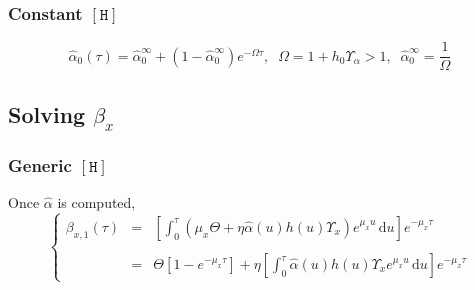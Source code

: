 \documentclass[aps,onecolumn,12pt]{revtex4}
\newcommand{\mychem}[1]{\mathtt{#1}}
\newcommand{\myconc}[1]{\left\lbrack{#1}\right\rbrack}
\newcommand{\spproton}{\mychem{H}}
\newcommand{\proton}{\myconc{\spproton}}
\begin{document}
\subsubsection{Constant $\proton$}
\begin{equation}
	\hat\alpha_0(\tau) = {\hat\alpha_0^\infty + \left(1-\hat\alpha_0^\infty\right) e^{-\Omega \tau} },
	\;\;\Omega=1+h_0\Upsilon_\alpha>1,
	\;\;\hat\alpha_0^\infty = \dfrac{1}{\Omega}
\end{equation}

\subsection{Solving $\beta_x$}

\subsubsection{Generic $\proton$}
Once $\hat\alpha$ is computed,
\begin{equation}
\left\lbrace
\begin{array}{rcl}
\beta_{x,1}(\tau) & = & \displaystyle \left[ \int_0^\tau \left( \mu_x \Theta + \eta \hat\alpha(u) h(u) \Upsilon_x \right)e^{\mu_x u} \, \mathrm{d} u \right] e^{-\mu_x\tau}\\
\\
& = & \displaystyle \Theta \left[ 1-e^{-\mu_x \tau}\right] + \eta \left[\int_0^\tau    \hat\alpha(u) h(u) \Upsilon_x  e^{\mu_x u} \, \mathrm{d} u\right] e^{-\mu_x \tau} 
\end{array}
\right.
\end{equation}
\end{document}
